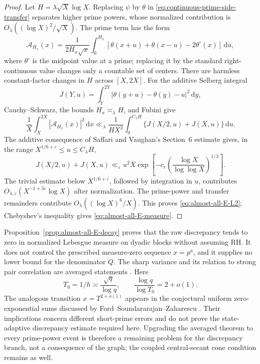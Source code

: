 \documentclass[11pt,a4paper]{article}
\numberwithin{equation}{section}
\theoremstyle{definition}
\newcommand{\dd}{\,\mathrm{d}}
\begin{document}
\begin{proof}
Let \(H=\lambda\sqrt X\log X\).  Replacing \(\psi\) by \(\theta\) in
\eqref{eq:continuous-prime-side-transfer} separates higher prime powers,
whose normalized contribution is
\(O_\lambda((\log X)^2/\sqrt X)\).  The prime term has the form
\[
 \mathcal A_{H_x}(x)=\frac1{2H_x\sqrt x}\int_0^{H_x}
 [\theta(x+u)+\theta(x-u)-2\theta^\circ(x)]\dd u,
\]
where \(\theta^\circ\) is the midpoint value at a prime; replacing it by the
standard right-continuous value changes only a countable set of centers.
There are harmless constant-factor changes in \(H\) across \([X,2X]\).
For the additive Selberg integral
\[
 J(Y,u)=\int_Y^{2Y}
 |\theta(y+u)-\theta(y)-u|^2\dd y,
\]
Cauchy--Schwarz, the bounds \(H_x\asymp_\lambda H\), and Fubini give
\[
 \frac1X\int_X^{2X}|\mathcal A_{H_x}(x)|^2\dd x
 \ll_\lambda\frac1{HX^2}\int_0^{C_\lambda H}
 \{J(X/2,u)+J(X,u)\}\dd u.
\]
The additive consequence of Saffari and Vaughan's Section~6 estimate
\cite{SaffariVaughan1977} gives, in the range
\(X^{1/6+\varepsilon}\le u\le C_\lambda H\),
\[
 J(X/2,u)+J(X,u)\ll_\varepsilon u^2X
 \exp\!\left[-c_\varepsilon
 \left(\frac{\log X}{\log\log X}\right)^{1/3}\right].
\]
The trivial estimate below \(X^{1/6+\varepsilon}\), followed by integration
in \(u\), contributes
\(O_{\lambda,\varepsilon}(X^{-1+3\varepsilon}\log X)\) after normalization.
The prime-power and transfer remainders contribute
\(O_\lambda((\log X)^6/X)\).  This proves
\eqref{eq:almost-all-E-L2}; Chebyshev's inequality gives
\eqref{eq:almost-all-E-measure}.
\end{proof}

Proposition~\ref{prop:almost-all-E-decay} proves that the raw discrepancy
tends to zero in normalized Lebesgue measure on dyadic blocks without
assuming RH.  It does not control the prescribed measure-zero sequence
\(x=p^a\), and it supplies no lower bound for the denominator \(Q\).  The
sharp variance and its relation to strong pair correlation are averaged
statements \cite{Chan2003}.  Here
\[
 T_0=1/h\asymp\frac{\sqrt q}{\log q},
 \qquad
 \frac{\log q}{\log T_0}=2+o(1).
\]
The analogous transition \(x=T^{2+o(1)}\) appears in the conjectural uniform
zero-exponential sums discussed by Ford--Soundararajan--Zaharescu
\cite{FordSoundZah2009}.  Their implications concern different short-prime
errors and do not prove the state-adaptive discrepancy estimate required
here.  Upgrading the averaged theorem to every prime-power event is therefore
a remaining problem for the discrepancy branch, not a consequence of the
graph; the coupled central-secant cone condition remains as well.
\end{document}

